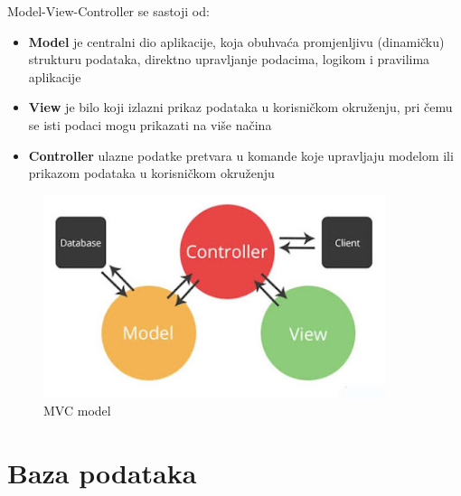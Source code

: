 	
	 {Model-View-Controller se sastoji od:}
	\begin{itemize}
		\item 	\textbf{Model} {je centralni dio aplikacije, koja obuhvaća promjenljivu (dinamičku) strukturu podataka, direktno upravljanje podacima, logikom i pravilima aplikacije}
		\item 	\textbf{View}{ je bilo koji izlazni prikaz podataka u korisničkom okruženju, pri čemu se isti podaci mogu prikazati na više načina}
		\item 	\textbf{Controller} {ulazne podatke pretvara u komande koje upravljaju modelom ili prikazom podataka u korisničkom okruženju}
	\end{itemize}
	
		\begin{figure}[H]
			\centering
			\includegraphics[width=100mm, scale=0.1]{slike/MVC.jpeg}
			\caption{MVC model}
			\label{fig:arhitektura}
		\end{figure}
\eject

		

				
		\section{Baza podataka}
			
			
			
